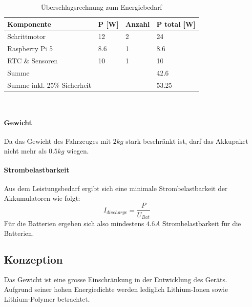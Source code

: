 \documentclass[main.tex]{subfiles} %
\begin{document}
\begin{table}[h!]
    \centering
    \begin{tabular}{|l|l|l|l|}
        \hline
        \textbf{Komponente}         & \textbf{P [W]} & \textbf{Anzahl} & \textbf{P total [W]} \\ \hline
        Schrittmotor                & 12             & 2               & 24                   \\ \hline
        Raspberry Pi 5              & 8.6            & 1               & 8.6                  \\ \hline
        RTC \& Sensoren             & 10             & 1               & 10                   \\ \hline
        Summe                       &                &                 & 42.6                 \\ \hline
        Summe inkl. 25\% Sicherheit &                &                 & 53.25                \\ \hline
    \end{tabular}
    \caption{Überschlagsrechnung zum Energiebedarf}~\label{tab:Energiebedarf_Akku}
\end{table}

\paragraph{Gewicht} Da das Gewicht des Fahrzeuges mit $2 kg$ stark beschränkt ist, darf das
Akkupaket nicht mehr als $ 0.5 kg$ wiegen.

\paragraph{Strombelastbarkeit}
Aus dem Leistungsbedarf ergibt sich eine minimale Strombelastbarkeit der
Akkumulatoren wie folgt:
\[
    I_{discharge} = \frac{P}{U_{Bat}}
\]
Für die Batterien ergeben sich also mindestens $4.6 A$ Strombelastbarkeit für
die Batterien.

\subsection*{Konzeption}

Das Gewicht ist eine grosse Einschränkung in der Entwicklung des Geräts.
Aufgrund seiner hohen Energiedichte werden lediglich Lithium-Ionen sowie
Lithium-Polymer betrachtet.

\end{document}
